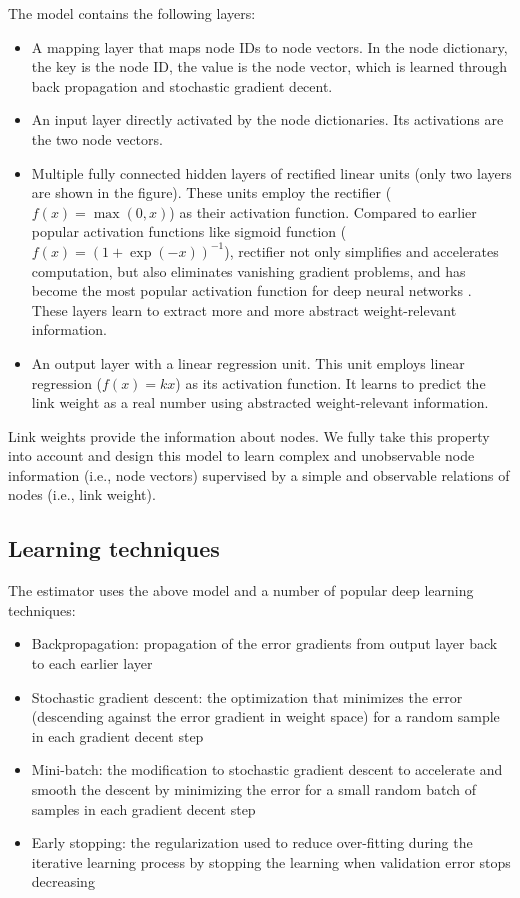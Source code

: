 \documentclass[conference]{IEEEtran}
\begin{document}
The model contains the following layers:
\begin{itemize}
	\item A mapping layer that maps node IDs to node vectors.
	In the node dictionary,	the key is the node ID, the value is the node vector,
	which is learned through back propagation and stochastic gradient decent.
	\item An input layer directly activated by the node dictionaries.
	Its activations are the two node vectors.
	\item Multiple fully connected hidden layers of rectified linear units
	(only two layers are shown in the figure).
	These units employ the rectifier ($ f(x) = \max (0, x) $)
	as their activation function.
	Compared to earlier popular activation functions like sigmoid function
	($ f(x) = (1 + \exp(-x))^{-1} $),
	rectifier not only simplifies and accelerates computation,
	but also eliminates vanishing gradient problems,
	and has become the most popular activation function
	for deep neural networks \cite{lecun2015deep}.
	These layers learn to extract more and more abstract weight-relevant 
	information.
	\item An output layer with a linear regression unit.
	This unit employs linear regression ($ f(x) = kx $) as its activation function.
	It learns to predict the link weight as a real number
	using abstracted weight-relevant information.
\end{itemize}
Link weights provide the information about nodes.
We fully take this property into account and design this model to learn 
complex and unobservable node information (i.e., node vectors) 
supervised by a simple and observable relations of nodes (i.e., link weight).

\subsection{Learning techniques}
The estimator uses the above model and a number of popular deep learning 
techniques:
\begin{itemize}
	\item Backpropagation: propagation of the error gradients from output layer 
	back to each earlier layer \cite{rumelhart1988learning}
	\item Stochastic gradient descent: the optimization that minimizes 
	the error (descending against the error gradient in weight space) for a 
	random sample in each gradient decent step \cite{lecun2012efficient}
	\item Mini-batch: the modification to stochastic gradient descent to 
	accelerate and smooth the descent by minimizing the error for a small 
	random batch of samples in each gradient decent step \cite{mairal2010online}
	\item Early stopping: the regularization used to reduce over-fitting during the iterative learning process by stopping the learning when validation error stops decreasing \cite{smale2007learning}
\end{itemize}
\end{document}
